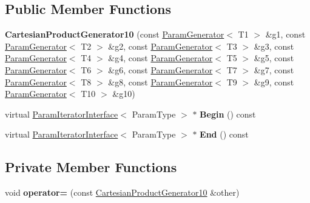 \subsection*{Public Member Functions}
\begin{DoxyCompactItemize}
\item 
\mbox{\label{classtesting_1_1internal_1_1_cartesian_product_generator10_a53d945670e910c0baaf14f3d25f1bbb6}} 
{\bfseries Cartesian\+Product\+Generator10} (const \mbox{\hyperlink{classtesting_1_1internal_1_1_param_generator}{Param\+Generator}}$<$ T1 $>$ \&g1, const \mbox{\hyperlink{classtesting_1_1internal_1_1_param_generator}{Param\+Generator}}$<$ T2 $>$ \&g2, const \mbox{\hyperlink{classtesting_1_1internal_1_1_param_generator}{Param\+Generator}}$<$ T3 $>$ \&g3, const \mbox{\hyperlink{classtesting_1_1internal_1_1_param_generator}{Param\+Generator}}$<$ T4 $>$ \&g4, const \mbox{\hyperlink{classtesting_1_1internal_1_1_param_generator}{Param\+Generator}}$<$ T5 $>$ \&g5, const \mbox{\hyperlink{classtesting_1_1internal_1_1_param_generator}{Param\+Generator}}$<$ T6 $>$ \&g6, const \mbox{\hyperlink{classtesting_1_1internal_1_1_param_generator}{Param\+Generator}}$<$ T7 $>$ \&g7, const \mbox{\hyperlink{classtesting_1_1internal_1_1_param_generator}{Param\+Generator}}$<$ T8 $>$ \&g8, const \mbox{\hyperlink{classtesting_1_1internal_1_1_param_generator}{Param\+Generator}}$<$ T9 $>$ \&g9, const \mbox{\hyperlink{classtesting_1_1internal_1_1_param_generator}{Param\+Generator}}$<$ T10 $>$ \&g10)
\item 
\mbox{\label{classtesting_1_1internal_1_1_cartesian_product_generator10_a162da48b48e325faf658d87188e23f0b}} 
virtual \mbox{\hyperlink{classtesting_1_1internal_1_1_param_iterator_interface}{Param\+Iterator\+Interface}}$<$ Param\+Type $>$ $\ast$ {\bfseries Begin} () const
\item 
\mbox{\label{classtesting_1_1internal_1_1_cartesian_product_generator10_a7573c282355a6816bc4f0a6693daec1a}} 
virtual \mbox{\hyperlink{classtesting_1_1internal_1_1_param_iterator_interface}{Param\+Iterator\+Interface}}$<$ Param\+Type $>$ $\ast$ {\bfseries End} () const
\end{DoxyCompactItemize}
\subsection*{Private Member Functions}
\begin{DoxyCompactItemize}
\item 
\mbox{\label{classtesting_1_1internal_1_1_cartesian_product_generator10_a2a8a2cc051940ce209d7df27cf820997}} 
void {\bfseries operator=} (const \mbox{\hyperlink{classtesting_1_1internal_1_1_cartesian_product_generator10}{Cartesian\+Product\+Generator10}} \&other)
\end{DoxyCompactItemize}
